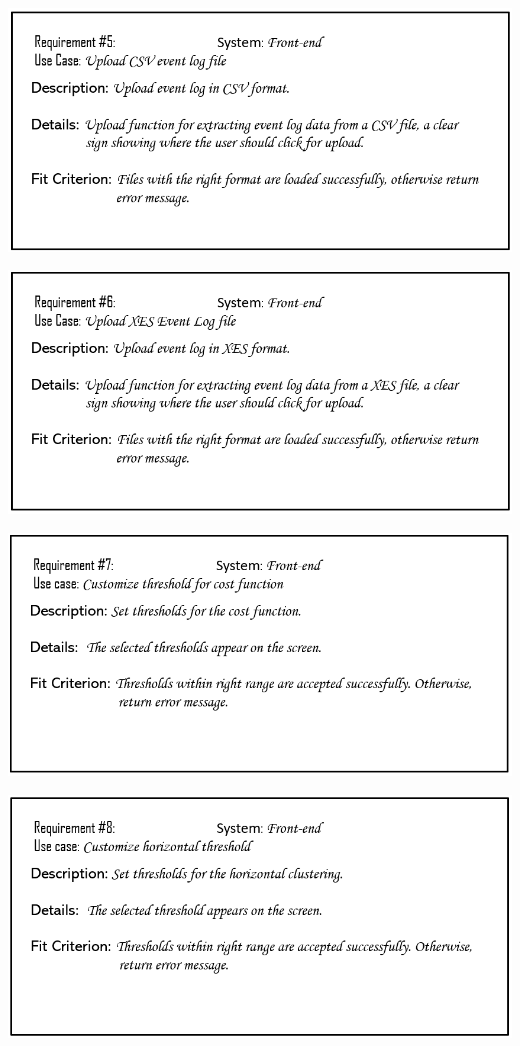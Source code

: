 \documentclass[notitlepage]{article}
\begin{document}
\begin{flushleft}
\includegraphics[scale=0.6]{reqq5.png}

\includegraphics[scale=0.6]{reqq6.png}

\includegraphics[scale=0.6]{reqq7.png}

\includegraphics[scale=0.6]{reqq8.png}


\end{flushleft}
\end{document}

